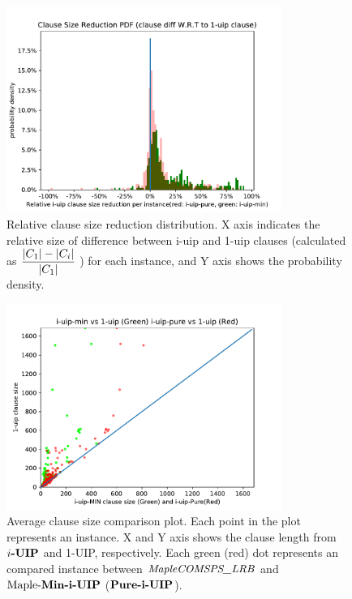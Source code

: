 \documentclass[runningheads]{llncs}
\begin{document}
\begin{figure}
    \centering
    \includegraphics[width=0.8\textwidth]{figures/clause_reduction_PDF.pdf}
    \caption{ Relative clause size reduction distribution. X axis indicates the relative size of difference between i-uip and 1-uip clauses (calculated as $\dfrac{|C_{1}|-|C_{i}|}{|C_{1}|}$ ) for each instance, and Y axis shows the probability density.}
     \label{fig:len_pdf}
\end{figure}
\begin{figure} \label{fig:len_compare}
    \centering
    \includegraphics[width=0.8\textwidth]{figures/i-uip-sizes-compare.pdf}
    \caption{Average clause size comparison plot. Each point in the plot represents an instance. X and Y axis shows the clause length from $\textbf{$i$-UIP}$ and 1-UIP, respectively. Each green (red) dot represents an compared instance between $\textit{MapleCOMSPS\_LRB}$ and $\text{Maple-\textbf{Min-i-UIP}}$ ($\textbf{Pure-i-UIP}$). }
    \label{fig:len_compare}
\end{figure}
\end{document}
